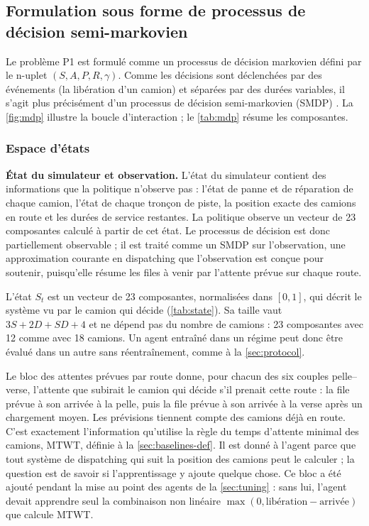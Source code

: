\documentclass[11pt,a4paper]{article}
\newif\ifrevmarks
\newcommand{\revtag}[1]{\ifrevmarks\textsuperscript{\textcolor{red!70!black}{\scriptsize[#1]}}\fi}
\newenvironment{revbloc}[1]{\par\ifrevmarks\color{revcolor}\noindent\revtag{#1}\ \fi}{\par}
\newif\ifcorrmarks
\newcommand{\corr}[1]{\ifcorrmarks\textcolor{corrcolor}{#1}\else#1\fi}
\begin{document}
\subsection{Formulation sous forme de processus de décision semi-markovien}
\label{sec:smdp}

\begin{revbloc}{M9, M24, Dir. 30/09}
Le problème P1 est formulé comme un processus de décision markovien \cite{Puterman1994, RichardSutton2018} défini par le n-uplet $(S, A, P, R, \gamma)$. Comme les décisions sont déclenchées par des événements (la libération d'un camion) et séparées par des durées variables, il s'agit plus précisément d'un processus de décision semi-markovien \corr{(SMDP)} \cite{BradtkeDuff1995, SuttonPrecupSingh1999}. La \cref{fig:mdp} illustre la boucle d'interaction ; le \cref{tab:mdp} résume les composantes.
\end{revbloc}

\subsubsection{Espace d'états}

\begin{revbloc}{M1, N1, N2, N3, v3}
\corr{\textbf{État du simulateur et observation.} L'état du simulateur contient des informations que la politique n'observe pas : l'état de panne et de réparation de chaque camion, l'état de chaque tronçon de piste, la position exacte des camions en route et les durées de service restantes. La politique observe un vecteur de 23 composantes calculé à partir de cet état. Le processus de décision est donc partiellement observable ; il est traité comme un \corr{SMDP} sur l'observation, une approximation courante en dispatching que l'observation est conçue pour soutenir, puisqu'elle résume les files à venir par l'attente prévue sur chaque route.}

L'état $S_t$ est un vecteur de 23 composantes, normalisées dans $[0,1]$, qui décrit le système vu par le camion qui décide (\cref{tab:state}). Sa taille vaut $3S + 2D + SD + 4$ et ne dépend pas du nombre de camions : 23 composantes avec 12 comme avec 18 camions. Un agent entraîné dans un régime peut donc être évalué dans un autre sans réentraînement, comme à la \cref{sec:protocol}.

Le bloc des attentes prévues par route donne, pour chacun des six couples pelle--verse, l'attente que subirait le camion qui décide s'il prenait cette route : la file prévue à son arrivée à la pelle, puis la file prévue à son arrivée à la verse après un chargement moyen. Les prévisions tiennent compte des camions déjà en route. C'est exactement l'information qu'utilise la règle du temps d'attente minimal des camions, MTWT, définie à la \cref{sec:baselines-def}. \corr{Il est donné à l'agent parce que tout système de dispatching qui suit la position des camions peut le calculer ; la question est de savoir si l'apprentissage y ajoute quelque chose.} Ce bloc a été ajouté pendant la mise au point des agents de la \cref{sec:tuning} : sans lui, l'agent devait apprendre seul la combinaison non linéaire $\max(0, \text{libération} - \text{arrivée})$ que calcule MTWT.
\end{revbloc}
\end{document}
